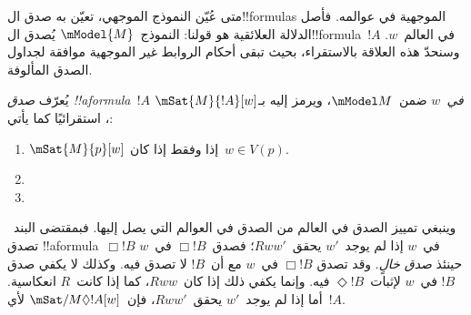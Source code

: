 \documentclass[../../../include/open-logic-section]{subfiles}
\begin{document}


متى عُيّن النموذج الموجهي، تعيّن به صدق ال!!{formula}s الموجهية
في عوالمه. فأصل الدلالة العلائقية هو قولنا: النموذج~$\mModel{M}$
يُصدق ال!!{formula}~$!A$ في العالم~$w$. وسنحدّ هذه العلاقة
بالاستقراء، بحيث تبقى أحكام الروابط غير الموجهية موافقة لجداول
الصدق المألوفة.

\begin{defn}
  يُعرّف \emph{صدق !!a{formula}~$!A$ في~$w$} ضمن~$\mModel M$، ويرمز
  إليه بـ$\mSat{M}{!A}[w]$، استقرائيًا كما يأتي:
  \begin{enumerate}
  \item $\mSat{M}{p}[w]$ إذا وفقط إذا كان~$w \in V(p)$.
  \item{}
  \item{}
  \end{enumerate}
\end{defn}

وينبغي تمييز الصدق في العالم من الصدق في العوالم التي يصل إليها.
فبمقتضى البند~ تصدق
!!a{formula}~$\Box !B$ في~$w$ إذا لم يوجد~$w'$ يحقق~$Rww'$؛
فصدق~$\Box !B$ في~$w$ حينئذ \emph{صدق خالٍ}. وقد تصدق
$\Box !B$ في~$w$ مع أن~$!B$ لا تصدق فيه. وكذلك لا يكفي صدق
$!B$ في~$w$ لإثبات~$\Diamond !B$ فيه. وإنما يكفي ذلك إذا كان~$Rww$،
كما إذا كانت~$R$ انعكاسية. أما إذا لم يوجد~$w'$ يحقق~$Rww'$،
فإن~$\mSat/{M}{\Diamond !A}[w]$ لأي~$!A$.
\end{document}
